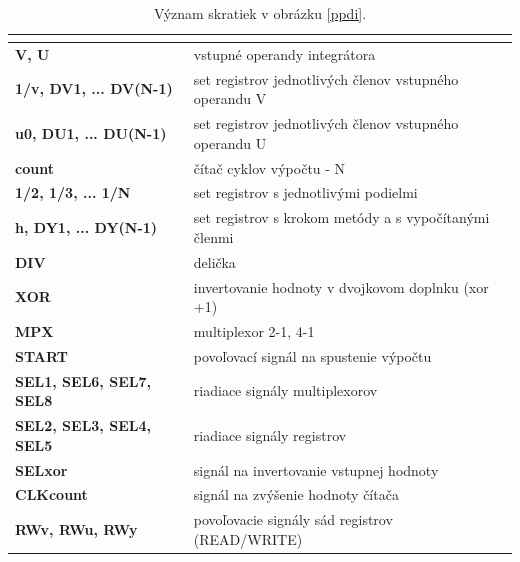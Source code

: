 \begin{table}[H]
\centering
\begin{tabular}{|
>{\columncolor[HTML]{DAE8FC}}l |l|}
\hline
\multicolumn{1}{|c|}{\cellcolor[HTML]{68CBD0}{\color[HTML]{000000} \textbf{Skratka}}} & \multicolumn{1}{c|}{\cellcolor[HTML]{68CBD0}{\color[HTML]{000000} \textbf{Popis}}} \\ \hline
\textbf{V, U} & vstupné operandy integrátora \\ \hline
\textbf{1/v, DV1, ... DV(N-1)} & set registrov jednotlivých členov vstupného operandu V \\ \hline
\textbf{u0, DU1, ... DU(N-1)} & set registrov jednotlivých členov vstupného operandu U \\ \hline
\textbf{count} & čítač cyklov výpočtu - N \\ \hline
\textbf{1/2, 1/3, ... 1/N} & set registrov s jednotlivými podielmi \\ \hline
\textbf{h, DY1, ... DY(N-1)} & set registrov s krokom metódy a s vypočítanými členmi \\ \hline
\textbf{DIV} & delička \\ \hline
\textbf{XOR} & invertovanie hodnoty v dvojkovom doplnku (xor +1) \\ \hline
\textbf{MPX} & multiplexor 2-1, 4-1 \\ \hline
\textbf{START} & povoľovací signál na spustenie výpočtu \\ \hline
\textbf{SEL1, SEL6, SEL7, SEL8} & riadiace signály multiplexorov \\ \hline
\textbf{SEL2, SEL3, SEL4, SEL5} & riadiace signály registrov \\ \hline
\textbf{SELxor} & signál na invertovanie vstupnej hodnoty \\ \hline
\textbf{CLKcount} & signál na zvýšenie hodnoty čítača \\ \hline
\textbf{RWv, RWu, RWy} & povoľovacie signály sád registrov (READ/WRITE) \\ \hline
\end{tabular}
\caption{Význam skratiek v obrázku \ref{ppdi}.}
\label{my-label}
\end{table}




